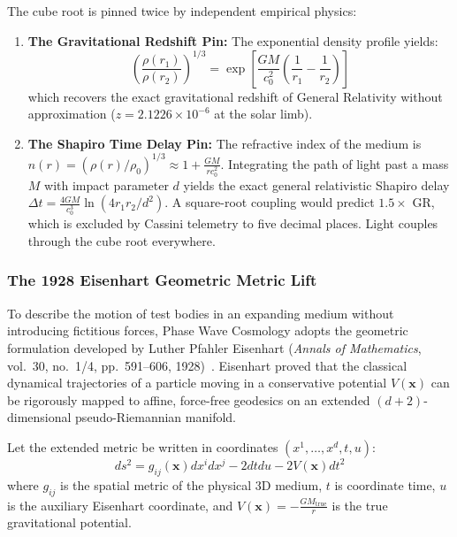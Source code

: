 \documentclass[11pt,a4paper]{article}
\begin{document}
The cube root is pinned twice by independent empirical physics:
\begin{enumerate}
    \item \textbf{The Gravitational Redshift Pin:} The exponential density profile yields:
    \begin{equation}
    \left(\frac{\rho(r_1)}{\rho(r_2)}\right)^{1/3} = \exp\left[\frac{GM}{c_0^2}\left(\frac{1}{r_1} - \frac{1}{r_2}\right)\right]
    \end{equation}
    which recovers the exact gravitational redshift of General Relativity without approximation ($z = 2.1226 \times 10^{-6}$ at the solar limb).
    \item \textbf{The Shapiro Time Delay Pin:} The refractive index of the medium is $n(r) = (\rho(r)/\rho_0)^{1/3} \approx 1 + \frac{GM}{r c_0^2}$. Integrating the path of light past a mass $M$ with impact parameter $d$ yields the exact general relativistic Shapiro delay $\Delta t = \frac{4GM}{c_0^3}\ln(4r_1 r_2 / d^2)$. A square-root coupling would predict $1.5\times$ GR, which is excluded by Cassini telemetry to five decimal places. Light couples through the cube root everywhere.
\end{enumerate}

\subsubsection{The 1928 Eisenhart Geometric Metric Lift}
\label{subsubsec:eisenhart_lift}

To describe the motion of test bodies in an expanding medium without introducing fictitious forces, Phase Wave Cosmology adopts the geometric formulation developed by Luther Pfahler Eisenhart (\textit{Annals of Mathematics}, vol.~30, no.~1/4, pp.~591--606, 1928)~\cite{Eisenhart1928}. Eisenhart proved that the classical dynamical trajectories of a particle moving in a conservative potential $V(\mathbf{x})$ can be rigorously mapped to affine, force-free geodesics on an extended $(d+2)$-dimensional pseudo-Riemannian manifold.

Let the extended metric be written in coordinates $(x^1, \dots, x^d, t, u)$:
\begin{equation}
ds^2 = g_{ij}(\mathbf{x}) dx^i dx^j - 2 dt du - 2 V(\mathbf{x}) dt^2
\label{eq:eisenhart_metric}
\end{equation}
where $g_{ij}$ is the spatial metric of the physical 3D medium, $t$ is coordinate time, $u$ is the auxiliary Eisenhart coordinate, and $V(\mathbf{x}) = -\frac{GM_{\text{true}}}{r}$ is the true gravitational potential.
\end{document}

